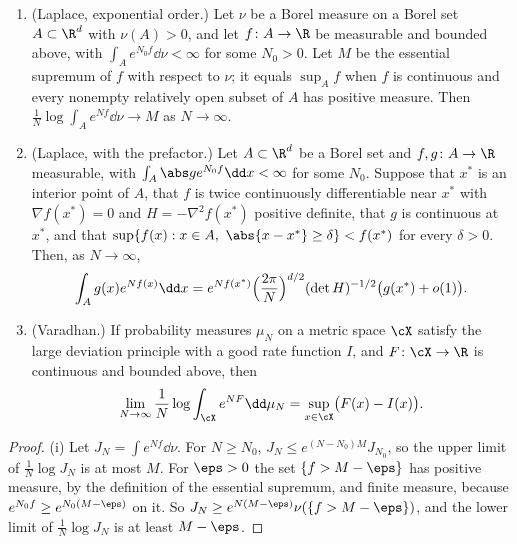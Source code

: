 \begin{refsection}
\begin{theorem}\label{thm:toolkit:laplace}
\leavevmode
\begin{enumerate}
\item (Laplace, exponential order.) Let $\nu$ be a Borel measure on a Borel set $A\subset\R^d$ with $\nu(A)>0$, and let $f\colon A\to\R$ be measurable and bounded above, with $\int_Ae^{N_0f}\dd\nu<\infty$ for some $N_0>0$. Let $M$ be the essential supremum of $f$ with respect to $\nu$; it equals $\sup_Af$ when $f$ is continuous and every nonempty relatively open subset of $A$ has positive measure. Then $\frac1N\log\int_Ae^{Nf}\dd\nu\to M$ as $N\to\infty$.
\item (Laplace, with the prefactor.) Let $A\subset\R^d$ be a Borel set and $f,g\colon A\to\R$ measurable, with $\int_A\abs ge^{N_0f}\dd x<\infty$ for some $N_0$. Suppose that $x^*$ is an interior point of $A$, that $f$ is twice continuously differentiable near $x^*$ with $\nabla f(x^*)=0$ and $H=-\nabla^2f(x^*)$ positive definite, that $g$ is continuous at $x^*$, and that $\sup\{f(x):x\in A,\ \abs{x-x^*}\ge\delta\}<f(x^*)$ for every $\delta>0$. Then, as $N\to\infty$,
\begin{equation}\label{eq:toolkit:laplace}
\int_Ag(x)e^{Nf(x)}\dd x=e^{Nf(x^*)}\Bigl(\frac{2\pi}N\Bigr)^{d/2}(\det H)^{-1/2}\bigl(g(x^*)+o(1)\bigr).
\end{equation}
\item (Varadhan.) If probability measures $\mu_N$ on a metric space $\cX$ satisfy the large deviation principle with a good rate function $I$, and $F\colon\cX\to\R$ is continuous and bounded above, then
\begin{equation}\label{eq:toolkit:varadhan}
\lim_{N\to\infty}\frac1N\log\int_\cX e^{NF}\dd\mu_N=\sup_{x\in\cX}\bigl(F(x)-I(x)\bigr).
\end{equation}
\end{enumerate}
\end{theorem}

\begin{proof}
(i) Let $J_N=\int e^{Nf}\dd\nu$. For $N\ge N_0$, $J_N\le e^{(N-N_0)M}J_{N_0}$, so the upper limit of $\frac1N\log J_N$ is at most $M$. For $\eps>0$ the set $\{f>M-\eps\}$ has positive measure, by the definition of the essential supremum, and finite measure, because $e^{N_0f}\ge e^{N_0(M-\eps)}$ on it. So $J_N\ge e^{N(M-\eps)}\nu(\{f>M-\eps\})$, and the lower limit of $\frac1N\log J_N$ is at least $M-\eps$.


\end{proof}
\end{refsection}
